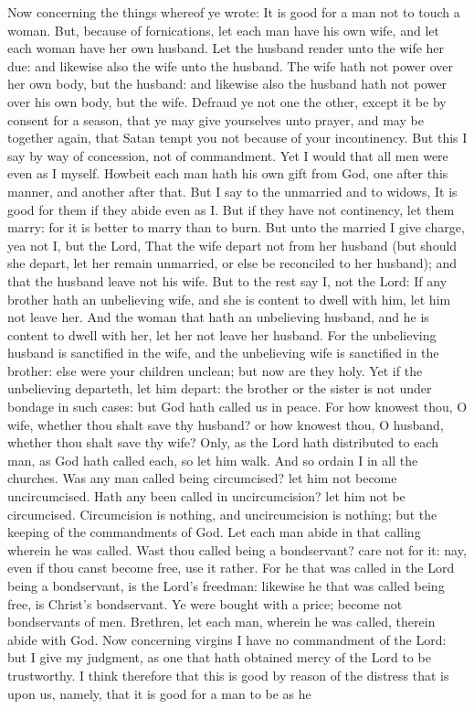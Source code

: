 Now concerning the things whereof ye wrote: It is good for a man not to touch a woman. But, because of fornications, let each man have his own wife, and let each woman have her own husband. Let the husband render unto the wife her due: and likewise also the wife unto the husband. The wife hath not power over her own body, but the husband: and likewise also the husband hath not power over his own body, but the wife. Defraud ye not one the other, except it be by consent for a season, that ye may give yourselves unto prayer, and may be together again, that Satan tempt you not because of your incontinency. But this I say by way of concession, not of commandment. Yet I would that all men were even as I myself. Howbeit each man hath his own gift from God, one after this manner, and another after that.  But I say to the unmarried and to widows, It is good for them if they abide even as I. But if they have not continency, let them marry: for it is better to marry than to burn. But unto the married I give charge, yea not I, but the Lord, That the wife depart not from her husband (but should she depart, let her remain unmarried, or else be reconciled to her husband); and that the husband leave not his wife. But to the rest say I, not the Lord: If any brother hath an unbelieving wife, and she is content to dwell with him, let him not leave her. And the woman that hath an unbelieving husband, and he is content to dwell with her, let her not leave her husband. For the unbelieving husband is sanctified in the wife, and the unbelieving wife is sanctified in the brother: else were your children unclean; but now are they holy. Yet if the unbelieving departeth, let him depart: the brother or the sister is not under bondage in such cases: but God hath called us in peace. For how knowest thou, O wife, whether thou shalt save thy husband? or how knowest thou, O husband, whether thou shalt save thy wife? Only, as the Lord hath distributed to each man, as God hath called each, so let him walk. And so ordain I in all the churches. Was any man called being circumcised? let him not become uncircumcised. Hath any been called in uncircumcision? let him not be circumcised. Circumcision is nothing, and uncircumcision is nothing; but the keeping of the commandments of God. Let each man abide in that calling wherein he was called. Wast thou called being a bondservant? care not for it: nay, even if thou canst become free, use it rather. For he that was called in the Lord being a bondservant, is the Lord’s freedman: likewise he that was called being free, is Christ’s bondservant. Ye were bought with a price; become not bondservants of men. Brethren, let each man, wherein he was called, therein abide with God.  Now concerning virgins I have no commandment of the Lord: but I give my judgment, as one that hath obtained mercy of the Lord to be trustworthy. I think therefore that this is good by reason of the distress that is upon us, namely, that it is good for a man to be as he 